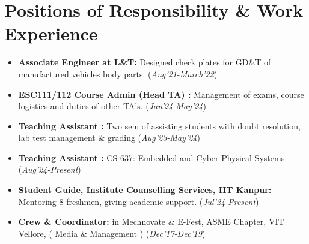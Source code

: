 \documentclass[10.8pt, a4paper]{extarticle}
\newcommand{\shorterSection}[1]{\vspace{-10pt}\section{#1}}
\begin{document}
\shorterSection{Positions of Responsibility \& Work Experience}
\begin{itemize}

\item \textbf{Associate Engineer at L\&T:} Designed check plates for GD\&T of manufactured 
 vehicles body parts. 
\href{https://drive.google.com/file/d/1OrfxyGyHMvoRFeCne3UPIx8iQgQaKPqk/view?usp=sharing}{\faLink{}} \href{https://drive.google.com/file/d/1JMF9GNNZ7MU2pVo0j9vEk110BOJtHZgV/view?usp=sharing}{\faLink{}}  \hfill\hfill(\textit{Aug'21-March'22})  \\[-0.6cm]

\item \textbf{ESC111/112 Course Admin (Head TA) :} Management of exams, course logistics and duties of other TA's. \hfill\hfill(\textit{Jan'24-May'24})  \\[-0.6cm]

\item \textbf{Teaching Assistant :} Two sem of assisting students with doubt resolution, lab test management \& grading \hfill\hfill(\textit{Aug'23-May'24})  \\[-0.6cm]

\item \textbf{Teaching Assistant :} CS 637: Embedded and Cyber-Physical Systems \hfill\hfill(\textit{Aug'24-Present})  \\[-0.6cm]

\item \textbf{Student Guide, Institute Counselling Services, IIT Kanpur:} Mentoring 8 freshmen, giving academic support. \hfill\hfill(\textit{Jul'24-Present})\\[-0.6cm]

\item \textbf{Crew \& Coordinator: }in Mechnovate \& E-Fest, ASME Chapter, VIT Vellore, ( Media \& Management ) 
\href{https://drive.google.com/file/d/1skeeRg3UISDUtRxwI7Nfen7c6zbsuysX/view?usp=sharing}{\faLink{}} \hfill\hfill(\textit{Dec'17-Dec'19}) 

\vspace{2mm}
\end{itemize}


\end{document}
